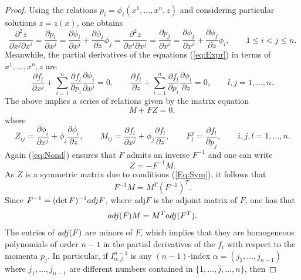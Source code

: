 \documentclass[12pt]{article}
\theoremstyle{plain}
\theoremstyle{definition}
\numberwithin{equation}{section}
\begin{document}
\begin{proof}
Using the relations $p_i=\phi_i(x^1,\ldots,x^n,z)$ and considering particular solutions $z=z(x)$, one obtains
\begin{equation}\label{Eq:Sym}
\frac{\partial^2 z}{\partial x^j\partial x^i}=\frac{\partial p_i}{\partial x^j}=\frac{\partial \phi_i}{\partial x^j}+\frac{\partial \phi_i}{\partial z}\phi_j=\frac{\partial^2 z}{\partial x^i\partial x^j}=\frac{\partial p_j}{\partial x^i}=\frac{\partial \phi_j}{\partial x^i}+\frac{\partial \phi_j}{\partial z}\phi_i,\qquad 1\leq i<j\leq n.
\end{equation}
Meanwhile, the partial derivatives of the equations (\ref{eq:Expr}) in terms of $x^1,\ldots,x^n,z$ are
$$
\frac{\partial f_l}{\partial x^j}+\sum_{i=1}^n\frac{\partial f_l}{\partial p_i}\frac{\partial\phi_i}{\partial x^j}=0,\qquad \frac{\partial f_l}{\partial z}+\sum_{i=1}^n\frac{\partial f_l}{\partial p_i}\frac{\partial \phi_i}{\partial z}=0,\qquad l,j=1,\ldots,n.
$$
The above implies a series of relations given by the matrix equation
$$
M+FZ=0,
$$
where
$$
Z_{ij}=\frac{\partial \phi_i}{\partial x^j}+\phi_j\frac{\partial \phi_i}{\partial z},\qquad M_{lj}=\frac{\partial f_l}{\partial x^j}+\phi_j\frac{\partial f_l}{\partial z},\qquad F_{l}^j=\frac{\partial f_l}{\partial p_j},\qquad i,j,l=1,\ldots,n.
$$
Again (\ref{eq:Nond}) ensures that  $F$ admits an inverse $F^{-1}$ and one can write
$$
Z=-F^{-1}M.
$$
As $Z$ is a symmetric matrix due to conditions (\ref{Eq:Sym}), it follows that 
$$
F^{-1}M=M^T(F^{-1})^T.
$$
Since $F^{-1}=({\det F})^{-1}{\rm adj}F$, where adj$F$ is the adjoint matrix of $F$, one has that 
\begin{equation}\label{eq:Com}
{\rm adj}(F)M=M^T{\rm adj}(F^T).
\end{equation}
The entries of ${\rm adj}(F)$ are minors of $F$, which implies that they are homogeneous polynomials of order $n-1$ in the partial derivatives of the $f_i$ with respect to the momenta $p_j$. In particular, if $I^{n-1}_{\alpha,j}$ is any $(n-1)$-index $\alpha=(j_1,\ldots,j_{n-1})$ where $j_1,\ldots,j_{n-1}$ are different numbers contained in $\{1,\ldots,\widehat{j},\ldots, n\}$, then 


\end{proof}
\end{document}
